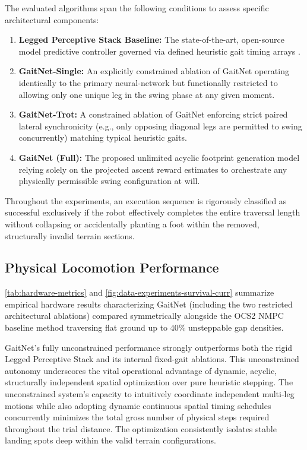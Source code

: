The evaluated algorithms span the following conditions to assess specific architectural components:
\begin{enumerate}
    \item \textbf{Legged Perceptive Stack Baseline:} The state-of-the-art, open-source model predictive controller governed via defined heuristic gait timing arrays \cite{leggedcontrol}.
    \item \textbf{GaitNet-Single:} An explicitly constrained ablation of GaitNet operating identically to the primary neural-network but functionally restricted to allowing only one unique leg in the swing phase at any given moment.
    \item \textbf{GaitNet-Trot:} A constrained ablation of GaitNet enforcing strict paired lateral synchronicity (e.g., only opposing diagonal legs are permitted to swing concurrently) matching typical heuristic gaits.
    \item \textbf{GaitNet (Full):} The proposed unlimited acyclic footprint generation model relying solely on the projected ascent reward estimates to orchestrate any physically permissible swing configuration at will.
\end{enumerate}

Throughout the experiments, an execution sequence is rigorously classified as successful exclusively if the robot effectively completes the entire traversal length without collapsing or accidentally planting a foot within the removed, structurally invalid terrain sections.

\subsection{Physical Locomotion Performance}
\label{subsec:physical_locomotion_performance}

\autoref{tab:hardware-metrics} and \autoref{fig:data-experiments-survival-curr} summarize empirical hardware results characterizing GaitNet (including the two restricted architectural ablations) compared symmetrically alongside the OCS2 NMPC baseline method traversing flat ground up to $40\%$ unsteppable gap densities.

GaitNet's fully unconstrained performance strongly outperforms both the rigid Legged Perceptive Stack and its internal fixed-gait ablations. This unconstrained autonomy underscores the vital operational advantage of dynamic, acyclic, structurally independent spatial optimization over pure heuristic stepping. The unconstrained system’s capacity to intuitively coordinate independent multi-leg motions while also adopting dynamic continuous spatial timing schedules concurrently minimizes the total gross number of physical steps required throughout the trial distance. The optimization consistently isolates stable landing spots deep within the valid terrain configurations. 

